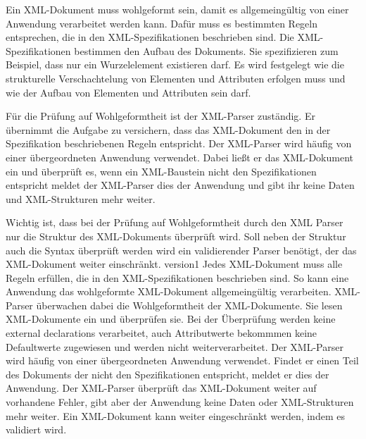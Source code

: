 Ein XML-Dokument muss wohlgeformt sein, damit es allgemeingültig von einer Anwendung verarbeitet werden kann. Dafür muss es bestimmten Regeln entsprechen, die in den XML-Spezifikationen beschrieben sind. Die XML-Spezifikationen bestimmen den Aufbau des Dokuments. Sie spezifizieren zum Beispiel, dass nur ein Wurzelelement existieren darf. Es wird festgelegt wie die strukturelle Verschachtelung von Elementen und Attributen erfolgen muss und wie der Aufbau von Elementen und Attributen sein darf. 

Für die Prüfung auf Wohlgeformtheit ist der XML-Parser zuständig. Er übernimmt die Aufgabe zu versichern, dass das XML-Dokument den in der Spezifikation beschriebenen Regeln entspricht. Der XML-Parser wird häufig von einer übergeordneten Anwendung verwendet. Dabei ließt er das XML-Dokument ein und überprüft es, wenn ein XML-Baustein nicht den Spezifikationen entspricht meldet der XML-Parser dies der Anwendung und gibt ihr keine Daten und XML-Strukturen mehr weiter. 

Wichtig ist, dass bei der Prüfung auf Wohlgeformtheit durch den XML Parser nur die Struktur des XML-Dokuments überprüft wird. Soll neben der Struktur auch die Syntax überprüft werden wird ein validierender Parser benötigt, der das XML-Dokument weiter einschränkt. 
version1
Jedes XML-Dokument muss alle Regeln erfüllen, die in den XML-Spezifikationen beschrieben sind. So kann eine Anwendung das wohlgeformte XML-Dokument allgemeingültig verarbeiten. XML-Parser überwachen dabei die Wohlgeformtheit der XML-Dokumente. Sie lesen XML-Dokumente ein und überprüfen sie. Bei der Überprüfung werden keine external declarations verarbeitet, auch Attributwerte bekommmen keine Defaultwerte zugewiesen und werden nicht weiterverarbeitet. Der XML-Parser wird häufig von einer übergeordneten Anwendung verwendet. Findet er einen Teil des Dokuments der nicht den Spezifikationen entspricht, meldet er dies der Anwendung. Der XML-Parser überprüft das XML-Dokument weiter auf vorhandene Fehler, gibt aber der Anwendung keine Daten oder XML-Strukturen mehr weiter. Ein XML-Dokument kann weiter eingeschränkt werden, indem es validiert wird.



